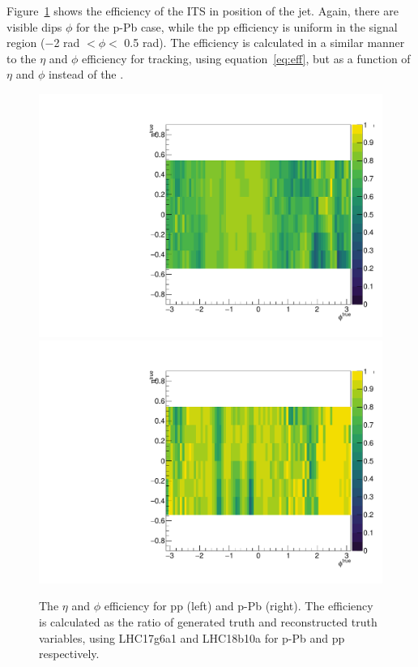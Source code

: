 Figure~\ref{fig:2DEffjets} shows the efficiency of the ITS in position of the jet. Again, there are visible dips $\phi$ for the p-Pb case, while the pp efficiency is uniform in the signal region ($-$2 rad $< \phi <$ 0.5 rad). The efficiency is calculated in a similar manner to the $\eta$ and $\phi$ efficiency for tracking, using equation~\ref{eq:eff}, but as a function of $\eta$ and $\phi$ instead of the \pt.  
\begin{figure}[h]
\center
\includegraphics[width=.495\textwidth]{JetResponse/jet_etaPhi_eff_its_pp.pdf}
\includegraphics[width=.495\textwidth]{JetResponse/jet_etaPhi_eff_its_pPb.pdf}
\caption{The $\eta$ and $\phi$ efficiency for pp (left) and p-Pb (right). The efficiency is calculated as the ratio of generated truth and reconstructed truth variables, using LHC17g6a1 and LHC18b10a for p-Pb and pp respectively.}
\label{fig:2DEffjets}
\end{figure}

